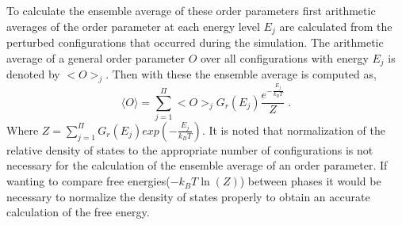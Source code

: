 \documentclass[aps,pre,reprint,superscriptaddress,showkeys]{revtex4-1}
\begin{document}
To calculate the ensemble average of these order parameters first arithmetic averages of the order parameter at each energy level $E_j$ are calculated from the perturbed configurations  that occurred during the simulation. The arithmetic average of a general order parameter $O$ over all configurations with energy $E_j$ is denoted by $< O >_j$. Then with these the ensemble average is computed as, 
  \begin{equation}
  \langle O \rangle  =  \sum_{j=1}^{\Pi}< O >_j G_r(E_j) \frac{e^{-\frac{E_j}{k_BT}}}{Z} \;.
  \label{ensembleaverage}
  \end{equation}
  Where $Z= \sum_{j=1}^{\Pi} G_r(E_j) exp(-\frac{E_j}{k_BT})$. 
It is noted that normalization of the relative density of states to the appropriate number of configurations is not necessary for the calculation of the ensemble average of an order parameter. If wanting to compare free energies($-k_BT\ln(Z)$) between phases it would be necessary to normalize the density of states properly to obtain an accurate calculation of the free energy. 
\end{document}
